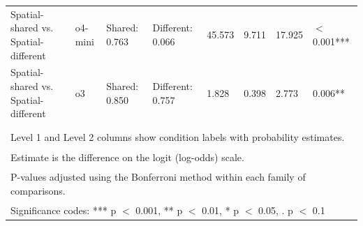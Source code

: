 \begin{table}[!h]
{\begin{tabular}[t]{llllllll}
Spatial-shared vs. Spatial-different & o4-mini & Shared: 0.763 & Different: 0.066 & 45.573 & 9.711 & 17.925 & $<$ 0.001***\\
Spatial-shared vs. Spatial-different & o3 & Shared: 0.850 & Different: 0.757 & 1.828 & 0.398 & 2.773 & 0.006**\\
 &  &  &  &  &  &  & \\
\bottomrule
\multicolumn{8}{l}{\textsuperscript{} Level 1 and Level 2 columns show condition labels with probability estimates.}\\
\multicolumn{8}{l}{\textsuperscript{} Estimate is the difference on the logit (log-odds) scale.}\\
\multicolumn{8}{l}{\textsuperscript{} P-values adjusted using the Bonferroni method within each family of comparisons.}\\
\multicolumn{8}{l}{\textsuperscript{} Significance codes: *** p $<$ 0.001, ** p $<$ 0.01, * p $<$ 0.05, . p $<$ 0.1}\\
\end{tabular}}
\end{table}
